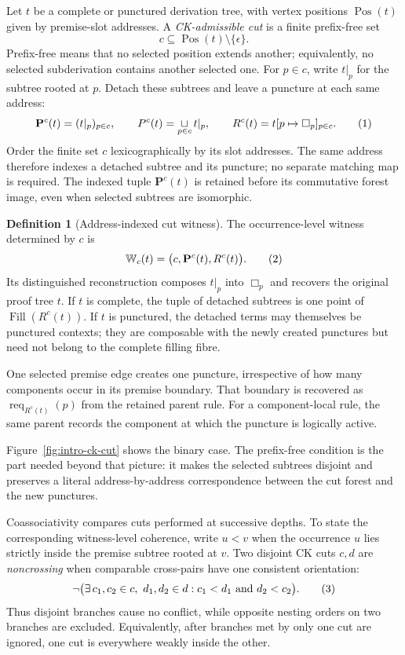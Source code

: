 \documentclass[10pt,a4paper]{article}
\theoremstyle{plain}
\theoremstyle{definition}
\newtheorem{definition}[theorem]{Definition}
\theoremstyle{remark}
\newcommand{\fjoin}{\mathbin{\sqcup}}
\newcommand{\Fill}{\operatorname{Fill}}
\newcommand{\Req}{\operatorname{req}}
\newcommand{\eqtag}{\refstepcounter{equation}\tag{\theequation}}
\begin{document}
Let \(t\) be a complete or punctured derivation tree, with vertex positions
\(\operatorname{Pos}(t)\) given by premise-slot addresses.  A
\emph{CK-admissible cut}
is a finite prefix-free set
\[
 c\subseteq\operatorname{Pos}(t)\setminus\{\epsilon\}.
\]
Prefix-free means that no selected position extends another; equivalently,
no selected subderivation contains another selected one.  For \(p\in c\),
write \(t|_p\) for the subtree rooted at \(p\).  Detach these subtrees and
leave a puncture at each same address:
\[
 \mathbf P^c(t)=(t|_p)_{p\in c},\qquad
 P^c(t)=\mathop{\fjoin}_{p\in c}t|_p,\qquad
 R^c(t)=t[p\mapsto\Box_p]_{p\in c}.
\eqtag\label{eq:cut-factors}
\]
Order the finite set \(c\) lexicographically by its slot addresses.  The same
address therefore indexes a detached subtree and its puncture; no separate
matching map is required.  The indexed tuple \(\mathbf P^c(t)\) is retained
before its commutative forest image, even when selected subtrees are
isomorphic.

\begin{definition}[Address-indexed cut witness]
\label{def:linked-cut}
The occurrence-level witness determined by \(c\) is
\[
 \mathbb W_c(t)=
 \bigl(c,\mathbf P^c(t),R^c(t)\bigr).
\eqtag\label{eq:linked-cut}
\]
Its distinguished reconstruction composes \(t|_p\) into \(\Box_p\) and
recovers the original proof tree \(t\).  If \(t\) is complete, the
tuple of detached subtrees is one
point of \(\Fill(R^c(t))\).  If \(t\) is punctured, the detached terms may
themselves be punctured contexts; they are composable with the newly
created punctures but need not belong to the complete filling fibre.
\end{definition}

One selected premise edge creates one puncture, irrespective of how many
components occur in its premise boundary.  That boundary is recovered as
\(\Req_{R^c(t)}(p)\) from the retained parent rule.  For a component-local
rule, the same parent records the component at which the puncture is
logically active.

Figure~\ref{fig:intro-ck-cut} shows the binary case.  The prefix-free
condition is the part needed beyond that picture: it makes the selected
subtrees disjoint and preserves a literal address-by-address correspondence
between the cut forest and the new punctures.

Coassociativity compares cuts performed at successive depths.  To
state the corresponding witness-level coherence, write \(u<v\) when the occurrence \(u\) lies strictly inside the premise
subtree rooted at \(v\).  Two disjoint CK cuts \(c,d\) are
\emph{noncrossing} when comparable cross-pairs have one consistent
orientation:
\[
 \neg\bigl(\exists\,c_1,c_2\in c,\ d_1,d_2\in d:
                  c_1<d_1\ \text{and}\ d_2<c_2\bigr).
\eqtag\label{eq:noncrossing-stages}
\]
Thus disjoint branches cause no conflict, while opposite nesting orders on
two branches are excluded.  Equivalently, after branches met by only one
cut are ignored, one cut is everywhere weakly inside the other.
\end{document}
